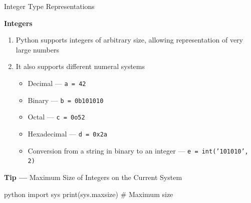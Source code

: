 \documentclass[
	11pt, 
]{beamer}
\begin{document}
\begin{frame}[fragile]{Integer Type Representations} %

\begin{block}{\textbf{Integers}}
\begin{enumerate}
    \item Python supports integers of arbitrary size, allowing representation of very large numbers 

    \item It also supports different numeral systems
    \vspace{.1cm}
    \begin{itemize}
        \item Decimal --- \texttt{a = 42}
        \item Binary ---  \texttt{b = 0b101010}
        \item Octal ---  \texttt{c = 0o52}
        \item Hexadecimal ---  \texttt{d = 0x2a}
        \item Conversion from a string in binary to an integer --- \texttt{e = int('101010', 2)}
    \end{itemize}

\end{enumerate}
\end{block}


\begin{exampleblock}{\textbf{Tip ---} Maximum Size of Integers on the Current System}
\vspace{.05cm}
\begin{mintedbox}{python}   
import sys
print(sys.maxsize)  # Maximum size
\end{mintedbox}
\end{exampleblock}

\end{frame}


\end{document}
